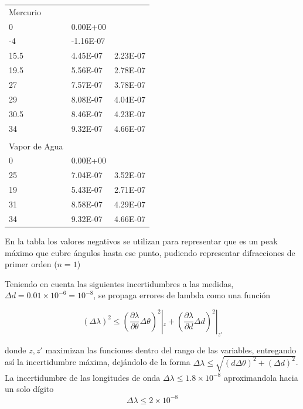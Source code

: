 \documentclass[a4paper,twocolumn,10pt]{article}
\begin{document}
\begin{table}[H]
\begin{tabular}{lll}
\rowcolor[rgb]{0,1,0.914} Mercurio      &           &           \\
0                                       & 0.00E+00  &           \\
-4                                      & -1.16E-07 &           \\
15.5                                    & 4.45E-07  & 2.23E-07  \\
19.5                                    & 5.56E-07  & 2.78E-07  \\
27                                      & 7.57E-07  & 3.78E-07  \\
29                                      & 8.08E-07  & 4.04E-07  \\
30.5                                    & 8.46E-07  & 4.23E-07  \\
34                                      & 9.32E-07  & 4.66E-07  \\
                                        &           &           \\
\rowcolor[rgb]{0,1,0.914} Vapor de Agua &           &           \\
0                                       & 0.00E+00  &           \\
25                                      & 7.04E-07  & 3.52E-07  \\
19                                      & 5.43E-07  & 2.71E-07  \\
31                                      & 8.58E-07  & 4.29E-07  \\
34                                      & 9.32E-07  & 4.66E-07 
\end{tabular}
\end{table}

En la tabla los valores negativos se utilizan para representar que es un peak máximo que cubre ángulos hasta ese punto, pudiendo representar difracciones de primer orden ($n=1$)

Teniendo en cuenta las siguientes incertidumbres a las medidas, $\Delta d = 0.01 \times 10^{-6}=10^{-8}$, se propaga errores de lambda como una función

$$(\Delta \lambda)^2 \leq (\frac{\partial \lambda}{\partial \theta} \Delta \theta)^2|_z + (\frac{\partial \lambda}{\partial d} \Delta d)^2|_{z'}$$

donde $z,z'$ maximizan las funciones dentro del rango de las variables, entregando así la incertidumbre máxima, dejándolo de la forma
$
\Delta \lambda \leq \sqrt{
    (d \Delta \theta)^2 + (\Delta d)^2
}
$.
La incertidumbre de las longitudes de onda $\Delta \lambda \leq 1.8 \times 10^{-8}$ aproximandola hacia un solo dígito
$$
\Delta \lambda \leq 2 \times 10^{-8}
$$
\end{document}
